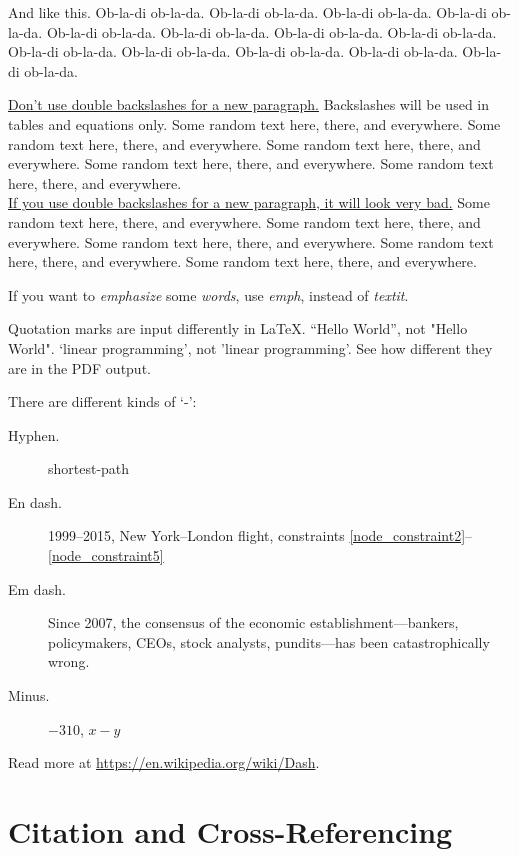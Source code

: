 \documentclass[letterpaper, 11pt]{article}
\begin{document}
And like this. Ob-la-di ob-la-da. Ob-la-di ob-la-da. Ob-la-di ob-la-da. Ob-la-di ob-la-da. Ob-la-di ob-la-da. Ob-la-di ob-la-da. Ob-la-di ob-la-da. Ob-la-di ob-la-da. Ob-la-di ob-la-da. Ob-la-di ob-la-da. Ob-la-di ob-la-da. Ob-la-di ob-la-da. Ob-la-di ob-la-da.

\uline{Don't use double backslashes for a new paragraph.} Backslashes will be used in tables and equations only. Some random text here, there, and everywhere. Some random text here, there, and everywhere. Some random text here, there, and everywhere. Some random text here, there, and everywhere. Some random text here, there, and everywhere.  \\
\uline{If you use double backslashes for a new paragraph, it will look very bad.} Some random text here, there, and everywhere. Some random text here, there, and everywhere. Some random text here, there, and everywhere. Some random text here, there, and everywhere. Some random text here, there, and everywhere. 

If you want to \emph{emphasize} some \emph{words}, use \emph{emph}, instead of \textit{textit}.

Quotation marks are input differently in LaTeX. ``Hello World'', not "Hello World". `linear programming', not 'linear programming'. See how different they are in the PDF output.

There are different kinds of `-':
\begin{description}
\item [Hyphen.] shortest-path
\item [En dash.] 1999--2015, New York--London flight, constraints \eqref{node_constraint2}--\eqref{node_constraint5}
\item [Em dash.] Since 2007, the consensus of the economic establishment---bankers, policymakers, CEOs, stock analysts, pundits---has been catastrophically wrong.
\item [Minus.] $-310$, $x-y$ 
\end{description}
Read more at \url{https://en.wikipedia.org/wiki/Dash}.














\section{Citation and Cross-Referencing} \label{sec:citation}
\end{document}
